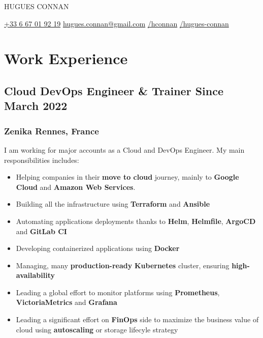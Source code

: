 \documentclass[11pt]{article}
\newcommand{\rside}[1]{
  \hfill {\normalfont\color{gray} #1}%
}
\begin{document}

\begin{center}
  {
    \fontsize{36}{12} 
    \selectfont
    \color{accent} 
    HUGUES CONNAN %
  } \\ \medskip


  \href{tel:+33667019219}{{\color{accent}{\faPhone}} +33 6 67 01 92 19} \quad
  \href{mailto:hugues.connan@gmail.com}{{\color{accent}{\faEnvelope}} hugues.connan@gmail.com} \quad 
  \href{https://github.com/hconnan}{{\color{accent}{\faGithub}} /hconnan} \quad
  \href{https://www.linkedin.com/in/hugues-connan}{{\color{accent}{\faLinkedin}} /hugues-connan} \quad
\end{center}


\section{Work Experience}

\subsection{Cloud DevOps Engineer \& Trainer \rside{Since March 2022}}
\subsubsection{Zenika \rside{Rennes, France}}

\begin{justify}
  I am working for major accounts as a Cloud and DevOps Engineer. My main responsibilities includes:
\end{justify}
\vspace{-2mm}

\begin{itemize}
  \item Helping companies in their \textbf{move to cloud} journey, mainly to \textbf{Google Cloud} and \textbf{Amazon Web Services}.
  \item Building all the infrastructure using \textbf{Terraform} and \textbf{Ansible}
  \item Automating applications deployments thanks to \textbf{Helm}, \textbf{Helmfile}, \textbf{ArgoCD} and \textbf{GitLab CI}
  \item Developing containerized applications using \textbf{Docker}
  \item Managing, many \textbf{production-ready} \textbf{Kubernetes} cluster, ensuring \textbf{high-availability}
  \item Leading a global effort to monitor platforms using \textbf{Prometheus}, \textbf{VictoriaMetrics} and \textbf{Grafana}
  \item Leading a significant effort on \textbf{FinOps} side to maximize the business value of cloud using \textbf{autoscaling} or storage lifecyle strategy
\end{itemize}
\end{document}

